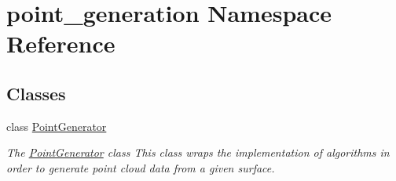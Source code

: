 \hypertarget{namespacepoint__generation}{}\section{point\+\_\+generation Namespace Reference}
\label{namespacepoint__generation}
\subsection*{Classes}
\begin{DoxyCompactItemize}
\item 
class \hyperlink{classpoint__generation_1_1_point_generator}{Point\+Generator}
\begin{DoxyCompactList}\small\item\em The \hyperlink{classpoint__generation_1_1_point_generator}{Point\+Generator} class This class wraps the implementation of algorithms in order to generate point cloud data from a given surface. \end{DoxyCompactList}\end{DoxyCompactItemize}

